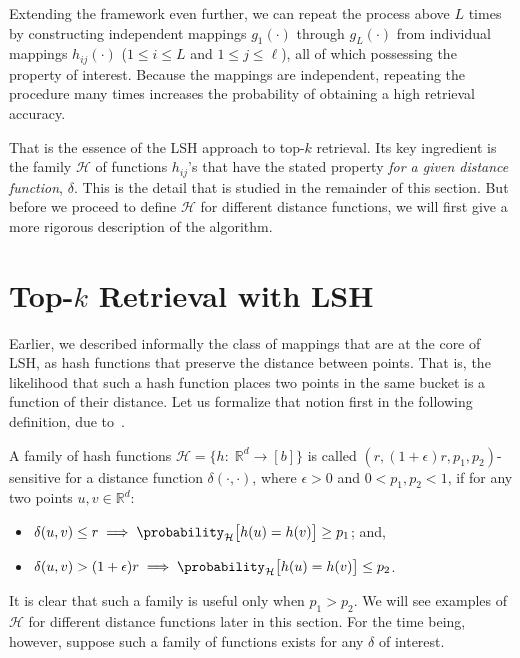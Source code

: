 Extending the framework even further, we can repeat the process above $L$ times
by constructing independent mappings $g_1(\cdot)$ through $g_L(\cdot)$ from
individual mappings $h_{ij}(\cdot)$ ($1 \leq i \leq L$ and $1 \leq j \leq \ell$),
all of which possessing the property of interest. Because the mappings are independent,
repeating the procedure many times increases the probability of obtaining a high
retrieval accuracy.

That is the essence of the LSH approach to top-$k$ retrieval.
Its key ingredient is the family $\mathcal{H}$ of functions $h_{ij}$'s that have the stated
property \emph{for a given distance function}, $\delta$.
This is the detail that is studied in the remainder of this section.
But before we proceed to define $\mathcal{H}$ for different distance functions,
we will first give a more rigorous description of the algorithm.

\section{Top-\texorpdfstring{$k$}{k} Retrieval with LSH}

Earlier, we described informally the class of mappings that are at the core
of LSH, as hash functions that preserve the distance between points. That is,
the likelihood that such a hash function places two points in the same bucket
is a function of their distance. Let us formalize that notion first in the
following definition, due to~\cite{lsh}.

\begin{definition}
    \label{definition:lsh:hash-family}
    A family of hash functions $\mathcal{H} = \{ h:\; \mathbb{R}^d \rightarrow [b] \}$
    is called $(r, (1 + \epsilon)r, p_1, p_2)$-sensitive for a distance function $\delta(\cdot, \cdot)$,
    where $\epsilon > 0$ and $0 < p_1, p_2 < 1$, if for any two points $u, v \in \mathbb{R}^d$:
    \begin{itemize}
        \item $\delta(u, v) \leq r \implies \probability_\mathcal{H}\big[ h(u) = h(v) \big] \geq p_1$; and,
        \item $\delta(u, v) > (1 + \epsilon)r \implies \probability_\mathcal{H}\big[ h(u) = h(v) \big] \leq p_2$.
    \end{itemize}
\end{definition}

It is clear that such a family is useful only when $p_1 > p_2$.
We will see examples of $\mathcal{H}$ for different distance functions later in this section.
For the time being, however, suppose such a family of functions exists for any $\delta$ of interest.


